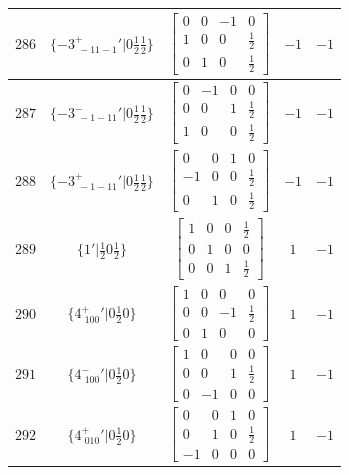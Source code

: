 \documentclass[fleqn,8pt]{jsarticle}
\begin{document}
\begin{longtable}{ccccc}
$ 286 $ & $ \{-3^{+}_{\,\,-11-1}{}'|0 \frac{1}{2} \frac{1}{2}\} $ & $ \begin{bmatrix} 0 & 0 & -1 & 0 \\ 1 & 0 & 0 & \frac{1}{2} \\ 0 & 1 & 0 & \frac{1}{2} \end{bmatrix} $ & $ -1 $ & $ -1 $ \\ \hline
$ 287 $ & $ \{-3^{-}_{\,\,-1-11}{}'|0 \frac{1}{2} \frac{1}{2}\} $ & $ \begin{bmatrix} 0 & -1 & 0 & 0 \\ 0 & 0 & 1 & \frac{1}{2} \\ 1 & 0 & 0 & \frac{1}{2} \end{bmatrix} $ & $ -1 $ & $ -1 $ \\ \hline
$ 288 $ & $ \{-3^{+}_{\,\,-1-11}{}'|0 \frac{1}{2} \frac{1}{2}\} $ & $ \begin{bmatrix} 0 & 0 & 1 & 0 \\ -1 & 0 & 0 & \frac{1}{2} \\ 0 & 1 & 0 & \frac{1}{2} \end{bmatrix} $ & $ -1 $ & $ -1 $ \\ \hline
$ 289 $ & $ \{1{}'|\frac{1}{2} 0 \frac{1}{2}\} $ & $ \begin{bmatrix} 1 & 0 & 0 & \frac{1}{2} \\ 0 & 1 & 0 & 0 \\ 0 & 0 & 1 & \frac{1}{2} \end{bmatrix} $ & $ 1 $ & $ -1 $ \\ \hline
$ 290 $ & $ \{4^{+}_{\,\,100}{}'|0 \frac{1}{2} 0\} $ & $ \begin{bmatrix} 1 & 0 & 0 & 0 \\ 0 & 0 & -1 & \frac{1}{2} \\ 0 & 1 & 0 & 0 \end{bmatrix} $ & $ 1 $ & $ -1 $ \\ \hline
$ 291 $ & $ \{4^{-}_{\,\,100}{}'|0 \frac{1}{2} 0\} $ & $ \begin{bmatrix} 1 & 0 & 0 & 0 \\ 0 & 0 & 1 & \frac{1}{2} \\ 0 & -1 & 0 & 0 \end{bmatrix} $ & $ 1 $ & $ -1 $ \\ \hline
$ 292 $ & $ \{4^{+}_{\,\,010}{}'|0 \frac{1}{2} 0\} $ & $ \begin{bmatrix} 0 & 0 & 1 & 0 \\ 0 & 1 & 0 & \frac{1}{2} \\ -1 & 0 & 0 & 0 \end{bmatrix} $ & $ 1 $ & $ -1 $ \\ \hline

\end{longtable}
\end{document}
